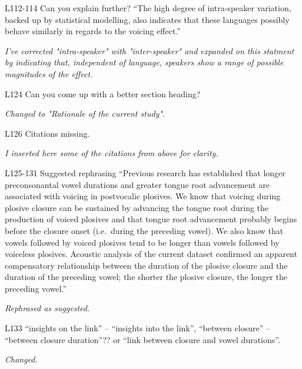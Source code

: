 \documentclass[]{article}
\begin{document}
L112-114 Can you explain further? ``The high degree of intra-speaker
variation, backed up by statistical modelling, also indicates that these
languages possibly behave similarly in regards to the voicing effect.''

\begin{adjustwidth}{1cm}{} \textit{
I've corrected "intra-speaker" with "inter-speaker" and expanded on this statment by indicating that, independent of language, speakers show a range of possible magnitudes of the effect.
} \end{adjustwidth}

L124 Can you come up with a better section heading?

\begin{adjustwidth}{1cm}{} \textit{
Changed to "Rationale of the current study".
} \end{adjustwidth}

L126 Citations missing.

\begin{adjustwidth}{1cm}{} \textit{
I inserted here some of the citations from above for clarity.
} \end{adjustwidth}

L125-131 Suggested rephrasing ``Previous research has established that
longer preconsonantal vowel durations and greater tongue root
advancement are associated with voicing in postvocalic plosives. We know
that voicing during plosive closure can be sustained by advancing the
tongue root during the production of voiced plosives and that tongue
root advancement probably begins before the closure onset (i.e.~during
the preceding vowel). We also know that vowels followed by voiced
plosives tend to be longer than vowels followed by voiceless plosives.
Acoustic analysis of the current dataset confirmed an apparent
compensatory relationship between the duration of the plosive closure
and the duration of the preceding vowel; the shorter the plosive
closure, the longer the preceding vowel.''

\begin{adjustwidth}{1cm}{} \textit{
Rephrased as suggested.
} \end{adjustwidth}

L133 ``insights on the link'' -- ``insights into the link'', ``between
closure'' -- ``between closure duration''?? or ``link between closure
and vowel durations''.

\begin{adjustwidth}{1cm}{} \textit{
Changed.
} \end{adjustwidth}
\end{document}
